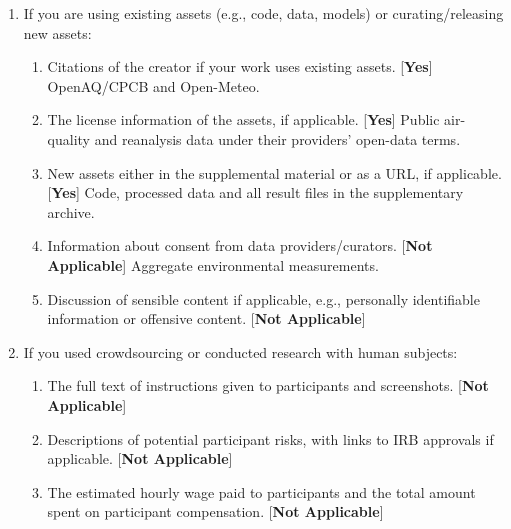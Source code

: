 \begin{enumerate}
\begin{enumerate}
  \item All the training details (e.g., data splits, hyperparameters, how they were selected). [\textbf{Yes}] Appendices~\ref{app:factorial}--\ref{app:ident}.
  \item A clear definition of the specific measure or statistics and error bars. [\textbf{Yes}] Mean absolute bias, RMSE and coverage over stated replications; HAC standard errors with stated lags; block-bootstrap intervals for robustness values.
  \item A description of the computing infrastructure used. [\textbf{Yes}] All experiments run on a two-core CPU machine; runtimes in Appendix~\ref{app:repro}.
\end{enumerate}
\item If you are using existing assets (e.g., code, data, models) or curating/releasing new assets:
\begin{enumerate}
  \item Citations of the creator if your work uses existing assets. [\textbf{Yes}] OpenAQ/CPCB and Open-Meteo.
  \item The license information of the assets, if applicable. [\textbf{Yes}] Public air-quality and reanalysis data under their providers' open-data terms.
  \item New assets either in the supplemental material or as a URL, if applicable. [\textbf{Yes}] Code, processed data and all result files in the supplementary archive.
  \item Information about consent from data providers/curators. [\textbf{Not Applicable}] Aggregate environmental measurements.
  \item Discussion of sensible content if applicable, e.g., personally identifiable information or offensive content. [\textbf{Not Applicable}]
\end{enumerate}
\item If you used crowdsourcing or conducted research with human subjects:
\begin{enumerate}
  \item The full text of instructions given to participants and screenshots. [\textbf{Not Applicable}]
  \item Descriptions of potential participant risks, with links to IRB approvals if applicable. [\textbf{Not Applicable}]
  \item The estimated hourly wage paid to participants and the total amount spent on participant compensation. [\textbf{Not Applicable}]
\end{enumerate}
\end{enumerate}

